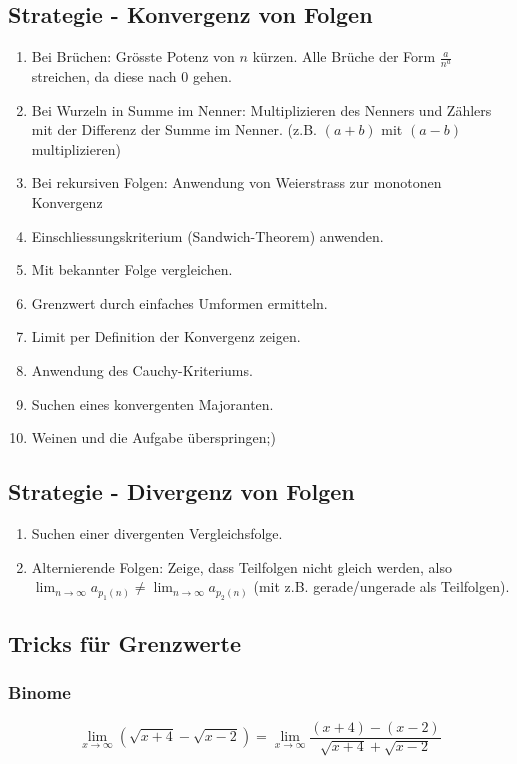 \documentclass[a4paper,fontsize = 7pt]{scrartcl}
\def\limn{\lim_{n\to \infty}}
\begin{document}
\subsection{Strategie - Konvergenz von Folgen}
\begin{enumerate}
 \item Bei Brüchen: Grösste Potenz von $n$ kürzen. Alle Brüche der Form $\frac{a}{n^a}$ streichen, da diese nach 0 gehen.
 \item Bei Wurzeln in Summe im Nenner: Multiplizieren des Nenners und Zählers mit der Differenz der Summe im Nenner. (z.B. $(a+b)$ mit $(a-b)$ multiplizieren)
 \item Bei rekursiven Folgen: Anwendung von Weierstrass zur monotonen Konvergenz
 \item Einschliessungskriterium (Sandwich-Theorem) anwenden.
 \item Mit bekannter Folge vergleichen.
 \item Grenzwert durch einfaches Umformen ermitteln.
 \item Limit per Definition der Konvergenz zeigen.
 \item Anwendung des Cauchy-Kriteriums.
 \item Suchen eines konvergenten Majoranten. 
 \item Weinen und die Aufgabe überspringen;)
\end{enumerate}

\subsection{Strategie - Divergenz von Folgen}
\begin{enumerate}
 \item Suchen einer divergenten Vergleichsfolge.
 \item Alternierende Folgen: Zeige, dass Teilfolgen nicht gleich werden, also $\limn a_{p_1(n)} \ne \limn a_{p_2(n)}$ (mit z.B. gerade/ungerade als Teilfolgen).
\end{enumerate}

\subsection{Tricks für Grenzwerte}
\subsubsection{Binome}
$$\lim_{x\to\infty} (\sqrt{x + 4} - \sqrt{x - 2}) = \lim_{x\to\infty} \frac{(x+4)-(x-2)}{\sqrt{x+4}+\sqrt{x-2}}$$
\end{document}
